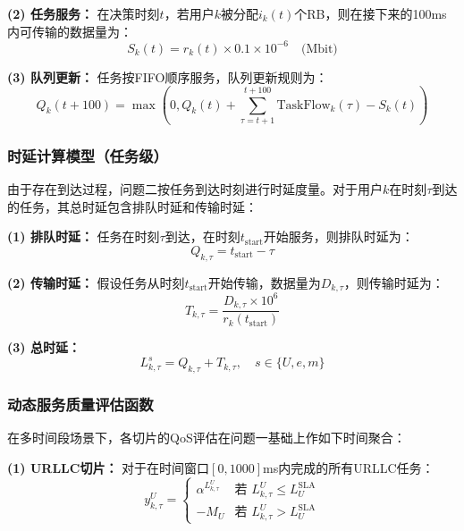 \textbf{(2) 任务服务：}
在决策时刻$t$，若用户$k$被分配$i_k(t)$个RB，则在接下来的100ms内可传输的数据量为：
\begin{equation}
S_k(t) = r_k(t) \times 0.1 \times 10^{-6} \quad \text{(Mbit)}
\end{equation}

\textbf{(3) 队列更新：}
任务按FIFO顺序服务，队列更新规则为：
\begin{equation}
Q_k(t+100) = \max\left(0, Q_k(t) + \sum_{\tau=t+1}^{t+100} \text{TaskFlow}_k(\tau) - S_k(t)\right)
\end{equation}

\subsubsection{时延计算模型（任务级）}
 
由于存在到达过程，问题二按任务到达时刻进行时延度量。对于用户$k$在时刻$\tau$到达的任务，其总时延包含排队时延和传输时延：

\textbf{(1) 排队时延：}
任务在时刻$\tau$到达，在时刻$t_{\text{start}}$开始服务，则排队时延为：
\begin{equation}
Q_{k,\tau} = t_{\text{start}} - \tau
\end{equation}

\textbf{(2) 传输时延：}
假设任务从时刻$t_{\text{start}}$开始传输，数据量为$D_{k,\tau}$，则传输时延为：
\begin{equation}
T_{k,\tau} = \frac{D_{k,\tau} \times 10^6}{r_k(t_{\text{start}})}
\end{equation}

\textbf{(3) 总时延：}
\begin{equation}
L_{k,\tau}^s = Q_{k,\tau} + T_{k,\tau}, \quad s \in \{U, e, m\}
\end{equation}

\subsubsection{动态服务质量评估函数}
 
在多时间段场景下，各切片的QoS评估在问题一基础上作如下时间聚合：

\textbf{(1) URLLC切片：}
对于在时间窗口$[0, 1000]$ms内完成的所有URLLC任务：
\begin{equation}
y_{k,\tau}^{U} = \begin{cases}
\alpha^{L_{k,\tau}^{U}} & \text{若 } L_{k,\tau}^{U} \leq L_{U}^{\text{SLA}} \\
-M_{U} & \text{若 } L_{k,\tau}^{U} > L_{U}^{\text{SLA}}
\end{cases}
\end{equation}

